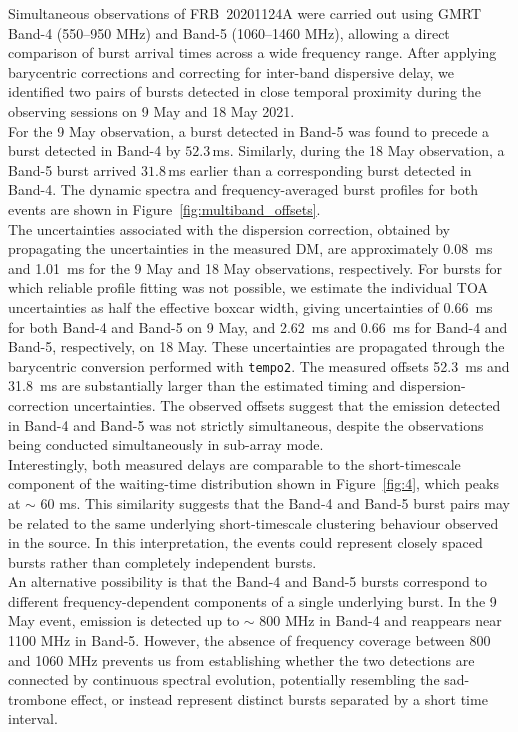 \documentclass[preprint2, trackchanges]{aastex631}
\begin{document}
Simultaneous observations of FRB~20201124A were carried out using GMRT Band-4 (550--950 MHz) and Band-5 (1060--1460 MHz), allowing a direct comparison of burst arrival times across a wide frequency range. After applying barycentric corrections and correcting for inter-band dispersive delay, we identified two pairs of bursts detected in close temporal proximity during the observing sessions on 9 May and 18 May 2021.
\\
For the 9 May observation, a burst detected in Band-5 was found to precede a burst detected in Band-4 by $52.3$\,ms. Similarly, during the 18 May observation, a Band-5 burst arrived $31.8$\,ms earlier than a corresponding burst detected in Band-4. The dynamic spectra and frequency-averaged burst profiles for both events are shown in Figure~\ref{fig:multiband_offsets}.
\\
The uncertainties associated with the dispersion correction, obtained by propagating the uncertainties in the measured DM, are approximately 0.08~ms and 1.01~ms for the 9 May and 18 May observations, respectively. For bursts for which reliable profile fitting was not possible, we estimate the individual TOA uncertainties as half the effective boxcar width, giving uncertainties of 0.66~ms for both Band-4 and Band-5 on 9 May, and 2.62~ms and 0.66~ms for Band-4 and Band-5, respectively, on 18 May. These uncertainties are propagated through the barycentric conversion performed with \texttt{tempo2}. The measured offsets 52.3~ms and 31.8~ms are substantially larger than the estimated timing and dispersion-correction uncertainties. The observed offsets suggest that the emission detected in Band-4 and Band-5 was not strictly simultaneous, despite the observations being conducted simultaneously in sub-array mode.
\\
Interestingly, both measured delays are comparable to the short-timescale component of the waiting-time distribution shown in Figure~\ref{fig:4}, which peaks at $\sim$ 60 ms. This similarity suggests that the Band-4 and Band-5 burst pairs may be related to the same underlying short-timescale clustering behaviour observed in the source. In this interpretation, the events could represent closely spaced bursts rather than completely independent bursts.
\\
An alternative possibility is that the Band-4 and Band-5 bursts correspond to different frequency-dependent components of a single underlying burst. In the 9 May event, emission is detected up to $\sim$ 800 MHz in Band-4 and reappears near 1100 MHz in Band-5. However, the absence of frequency coverage between 800 and 1060 MHz prevents us from establishing whether the two detections are connected by continuous spectral evolution, potentially resembling the sad-trombone effect, or instead represent distinct bursts separated by a short time interval.
\end{document}
